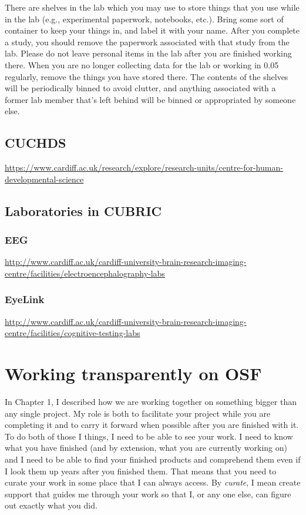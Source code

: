 \documentclass[
  12pt,
]{book}
\begin{document}
There are shelves in the lab which you may use to store things that you use while in the lab (e.g., experimental paperwork, notebooks, etc.). Bring some sort of container to keep your things in, and label it with your name. After you complete a study, you should remove the paperwork associated with that study from the lab. Please do not leave personal items in the lab after you are finished working there. When you are no longer collecting data for the lab or working in 0.05 regularly, remove the things you have stored there. The contents of the shelves will be periodically binned to avoid clutter, and anything associated with a former lab member that's left behind will be binned or appropriated by someone else.

\section{CUCHDS}\label{cuchds}

\url{https://www.cardiff.ac.uk/research/explore/research-units/centre-for-human-developmental-science}

\section{Laboratories in CUBRIC}\label{laboratories-in-cubric}

\subsection{EEG}\label{eeg}

\url{http://www.cardiff.ac.uk/cardiff-university-brain-research-imaging-centre/facilities/electroencephalography-labs}

\subsection{EyeLink}\label{eyelink}

\url{http://www.cardiff.ac.uk/cardiff-university-brain-research-imaging-centre/facilities/cognitive-testing-labs}

\chapter{Working transparently on OSF}\label{working-transparently-on-osf}

In Chapter 1, I described how we are working together on something bigger than any single project. My role is both to facilitate your project while you are completing it and to carry it forward when possible after you are finished with it. To do both of those I things, I need to be able to see your work. I need to know what you have finished (and by extension, what you are currently working on) and I need to be able to find your finished products and comprehend them even if I look them up years after you finished them. That means that you need to curate your work in some place that I can always access. By \emph{curate}, I mean create support that guides me through your work so that I, or any one else, can figure out exactly what you did.
\end{document}
